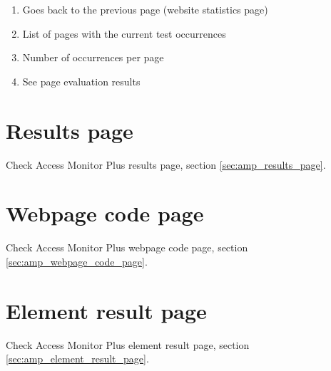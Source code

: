 \begin{enumerate}
    \item Goes back to the previous page (website statistics page)
    \item List of pages with the current test occurrences
    \item Number of occurrences per page
    \item See page evaluation results
\end{enumerate}

\section{Results page}

Check Access Monitor Plus results page, section \ref{sec:amp_results_page}.

\section{Webpage code page}

Check Access Monitor Plus webpage code page, section \ref{sec:amp_webpage_code_page}.

\section{Element result page}

Check Access Monitor Plus element result page, section \ref{sec:amp_element_result_page}.